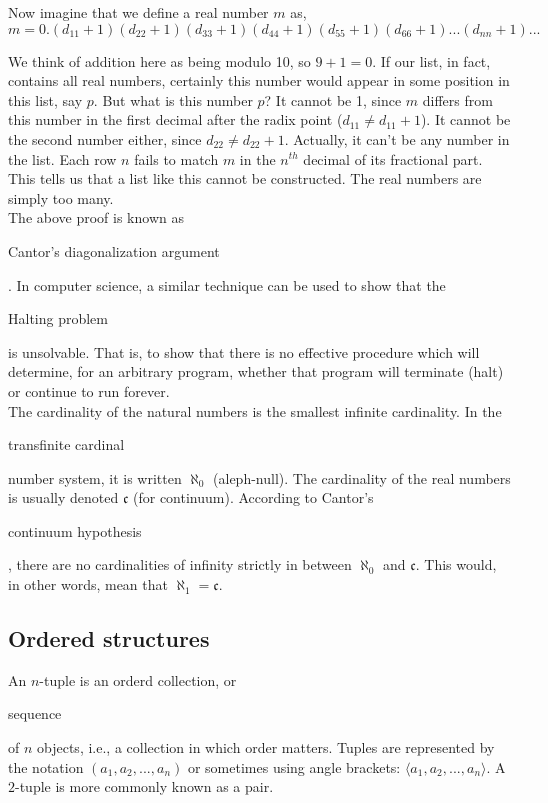 \documentclass[11pt]{article}
\theoremstyle{plain}
\theoremstyle{definition}
\begin{document}
\noindent Now imagine that we define a real number $ m $ as,
$$
m = 0.(d_{11}+1)(d_{22}+1)(d_{33}+1)(d_{44}+1)(d_{55}+1)(d_{66}+1) ... (d_{nn}+1) ...
$$

\noindent We think of addition here as being modulo 10, so $ 9 + 1 = 0 $. If our list, in fact, contains all real numbers, certainly this number would appear in some position in this list, say $ p $. But what is this number $ p $? It cannot be 1, since $ m $ differs from this number in the first decimal after the radix point ($ d_{11} \ne d_{11} + 1 $). It cannot be the second number either, since $ d_{22} \ne d_{22} + 1 $. Actually, it can't be any number in the list. Each row $ n $ fails to match $ m $ in the $ n^{th} $ decimal of its fractional part. This tells us that a list like this cannot be constructed. The real numbers are simply too many. \\

\noindent The above proof is known as \begin{em}Cantor's diagonalization argument\end{em}. In computer science, a similar technique can be used to show that the \begin{em}Halting problem\end{em} is unsolvable. That is, to show that there is no effective procedure which will determine, for an arbitrary program, whether that program will terminate (halt) or continue to run forever. \\

\noindent The cardinality of the natural numbers is the smallest infinite cardinality. In the \begin{em}transfinite cardinal\end{em} number system, it is written $ \aleph_0 $ (aleph-null). The cardinality of the real numbers is usually denoted $ \mathfrak{c} $ (for continuum). 
According to Cantor's \begin{em}continuum hypothesis\end{em}, there are no cardinalities of infinity strictly in between $ \aleph_0 $ and $ \mathfrak{c} $. This would, in other words, mean that $ \aleph_1 = \mathfrak{c} $. 

\subsection*{Ordered structures}

An $ n $-tuple is an orderd collection, or \begin{em}sequence\end{em} of $ n $ objects, i.e., a collection in which order matters. Tuples are represented by the notation $ ( a_1, a_2, ..., a_n ) $ or sometimes using angle brackets: $ \langle a_1, a_2, ..., a_n \rangle $. A $ 2 $-tuple is more commonly known as a pair.
\end{document}
